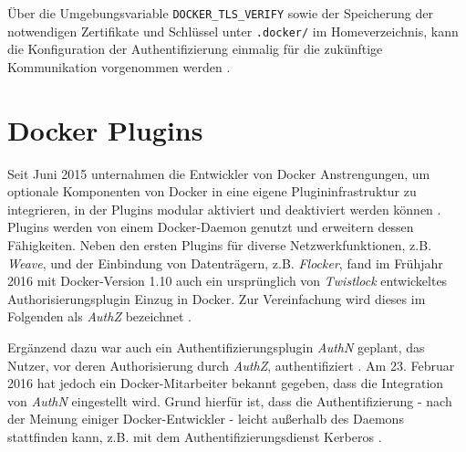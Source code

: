 \documentclass[../main.tex]{subfiles}
\begin{document}
    Über die Umgebungsvariable \texttt{DOCKER\_TLS\_VERIFY} sowie der Speicherung der notwendigen Zertifikate und Schlüssel unter \texttt{.docker/} im Homeverzeichnis, kann die Konfiguration der Authentifizierung einmalig für die zukünftige Kommunikation vorgenommen werden \cite{dockerSecurityHTTPS}.




  \section{Docker Plugins}
  \label{plugins}
    Seit Juni 2015 unternahmen die Entwickler von Docker Anstrengungen, um optionale Komponenten von Docker in eine eigene Plugininfrastruktur zu integrieren, in der Plugins modular aktiviert und deaktiviert werden können \cite{githubDockerChangelog}\cite{dockerPlugins}. Plugins werden von einem Docker-Daemon genutzt und erweitern dessen Fähigkeiten. Neben den ersten Plugins für diverse Netzwerkfunktionen, z.B. \emph{Weave}, und der Einbindung von Datenträgern, z.B. \emph{Flocker}, fand im Frühjahr 2016 mit Docker-Version 1.10 auch ein ursprünglich von \emph{Twistlock}\cite{twistlock} entwickeltes Authorisierungsplugin Einzug in Docker. Zur Vereinfachung wird dieses im Folgenden als \emph{AuthZ} bezeichnet \cite{githubPluginList}\cite{dockerPlugins}\cite{authzTwistlock}.

    Ergänzend dazu war auch ein Authentifizierungsplugin \emph{AuthN} geplant, das Nutzer, vor deren Authorisierung durch \emph{AuthZ}, authentifiziert \cite{githubAuthZDockerAccessControl}. Am 23. Februar 2016 hat jedoch ein Docker-Mitarbeiter bekannt gegeben, dass die Integration von \emph{AuthN} eingestellt wird. Grund hierfür ist, dass die Authentifizierung - nach der Meinung einiger Docker-Entwickler - leicht außerhalb des Daemons stattfinden kann, z.B. mit dem Authentifizierungsdienst Kerberos \cite{kerberos}\cite{githubAuthZKerberosSupport}\cite{githubAuthNLaydown}.
\end{document}
